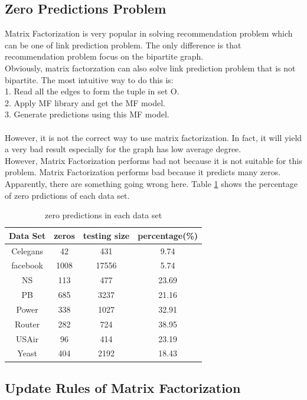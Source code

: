 \documentclass[12pt]{article}
\begin{document}
\subsection{Zero Predictions Problem}
Matrix Factorization is very popular in solving recommendation problem which can be one of link prediction problem. The only difference is that recommendation problem focus on the bipartite graph. 
\\
Obviously, matrix factorzation can also solve link prediction problem that is not bipartite. The most intuitive way to do this is: 
\\
1. Read all the edges to form the tuple in set O.
\\
2. Apply MF library and get the MF model.
\\
3. Generate predictions using this MF model.
\\
\\
However, it is not the correct way to use matrix factorization. In fact, it will yield a very bad result especially for the graph has low average degree. 
\\
However, Matrix Factorization performs bad not because it is not suitable for this problem. Matrix Factorization performs bad because it predicts many zeros. Apparently, there are something going wrong here. Table \ref{tab:zero} shows the percentage of zero prdictions of each data set. 
\\
\begin{table}
	\begin{center}
		\begin{tabular}{|c|c|c|c|}
			\hline
			Data Set & zeros & testing size & percentage(\%) \\
			\hline
			Celegans&42&431&9.74 \\
			facebook&1008&17556&5.74 \\
			NS&113&477&23.69 \\
			PB&685&3237&21.16 \\
			Power&338&1027&32.91 \\
			Router&282&724&38.95 \\
			USAir&96&414&23.19 \\
			Yeast&404&2192&18.43 \\
			\hline
		\end{tabular}
	\end{center}
	\caption{zero predictions in each data set}
	\label{tab:zero}
\end{table}

\subsection {Update Rules of Matrix Factorization}
\end{document}
